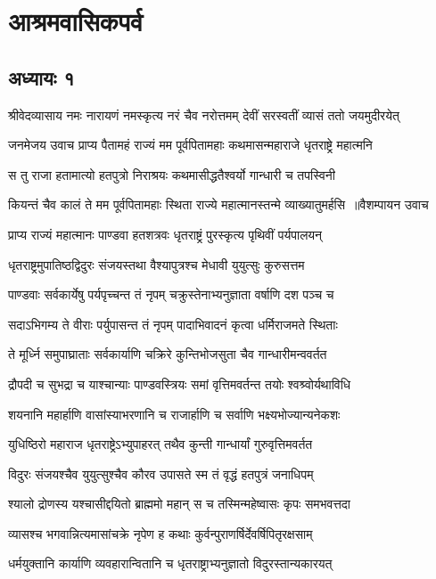 \part{आश्रमवासिकपर्व}
\chapter{अध्यायः १}
\threelineshloka
{श्रीवेदव्यासाय नमः}
{नारायणं नमस्कृत्य नरं चैव नरोत्तमम्}
{देवीं सरस्वतीं व्यासं ततो जयमुदीरयेत्}


\threelineshloka
{जनमेजय उवाच}
{प्राप्य पैतामहं राज्यं मम पूर्वपितामहाः}
{कथमासन्महाराजे धृतराष्ट्रे महात्मनि}


\twolineshloka
{स तु राजा हतामात्यो हतपुत्रो निराश्रयः}
{कथमासीद्धतैश्वर्यो गान्धारी च तपस्विनी}


\threelineshloka
{कियन्तं चैव कालं ते मम पूर्वपितामहाः}
{स्थिता राज्ये महात्मानस्तन्मे व्याख्यातुमर्हसि ॥वैशम्पायन उवाच}
{}


\twolineshloka
{प्राप्य राज्यं महात्मानः पाण्डवा हतशत्रवः}
{धृतराष्ट्रं पुरस्कृत्य पृथिवीं पर्यपालयन्}


\twolineshloka
{धृतराष्ट्रमुपातिष्ठद्विदुरः संजयस्तथा}
{वैश्यापुत्रश्च मेधावी युयुत्सुः कुरुसत्तम}


\twolineshloka
{पाण्डवाः सर्वकार्येषु पर्यपृच्चन्त तं नृपम्}
{चक्रुस्तेनाभ्यनुज्ञाता वर्षाणि दश पञ्च च}


\twolineshloka
{सदाऽभिगम्य ते वीराः पर्युपासन्त तं नृपम्}
{पादाभिवादनं कृत्वा धर्मिराजमते स्थिताः}


\twolineshloka
{ते मूर्ध्नि समुपाघ्राताः सर्वकार्याणि चक्रिरे}
{कुन्तिभोजसुता चैव गान्धारीमन्ववर्तत}


\twolineshloka
{द्रौपदी च सुभद्रा च याश्चान्याः पाण्डवस्त्रियः}
{समां वृत्तिमवर्तन्त तयोः श्वश्र्वोर्यथाविधि}


\twolineshloka
{शयनानि महार्हाणि वासांस्याभरणानि च}
{राजार्हाणि च सर्वाणि भक्ष्यभोज्यान्यनेकशः}


\twolineshloka
{युधिष्ठिरो महाराज धृतराष्ट्रेऽभ्युपाहरत्}
{तथैव कुन्ती गान्धार्यां गुरुवृत्तिमवर्तत}


\twolineshloka
{विदुरः संजयश्चैव युयुत्सुश्चैव कौरव}
{उपासते स्म तं वृद्धं हतपुत्रं जनाधिपम्}


\twolineshloka
{श्यालो द्रोणस्य यश्चासीद्दयितो ब्राह्ममो महान्}
{स च तस्मिन्महेष्वासः कृपः समभवत्तदा}


\twolineshloka
{व्यासश्च भगवान्नित्यमासांचक्रे नृपेण ह}
{कथाः कुर्वन्पुराणर्षिर्देवर्षिपितृरक्षसाम्}


\twolineshloka
{धर्मयुक्तानि कार्याणि व्यवहारान्वितानि च}
{धृतराष्ट्राभ्यनुज्ञातो विदुरस्तान्यकारयत्}


